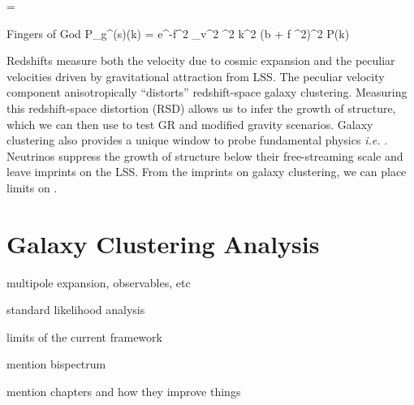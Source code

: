 \beq
\mu =  \odot {} 
\eeq

Fingers of God 
\beq
P_g^{(s)}(k) = e^{-f^2 \sigma_v^2 \mu^2 k^2} (b + f \mu^2)^2 P(k)
\eeq



Redshifts measure both the velocity due to cosmic expansion and the peculiar velocities driven by gravitational attraction from LSS. 
The peculiar velocity component anisotropically ``distorts'' redshift-space galaxy clustering. 
Measuring this redshift-space distortion (RSD) allows us to infer the growth of structure, which we can then use to test GR and modified gravity scenarios. 
Galaxy clustering also provides a unique window to probe fundamental physics {\em i.e.} \mneut. 
Neutrinos suppress the growth of structure below their free-streaming scale and leave imprints on the LSS. 
From the imprints on galaxy clustering, we can place limits on \mneut. 

\section{Galaxy Clustering Analysis}%

\begin{enumerate}
{\item 
multipole expansion, observables, etc
}
{\item 
standard likelihood analysis  
}
{\item 
limits of the current framework
}
{\item 
mention bispectrum
}
{\item 
mention chapters and how they improve things
}
\end{enumerate}

